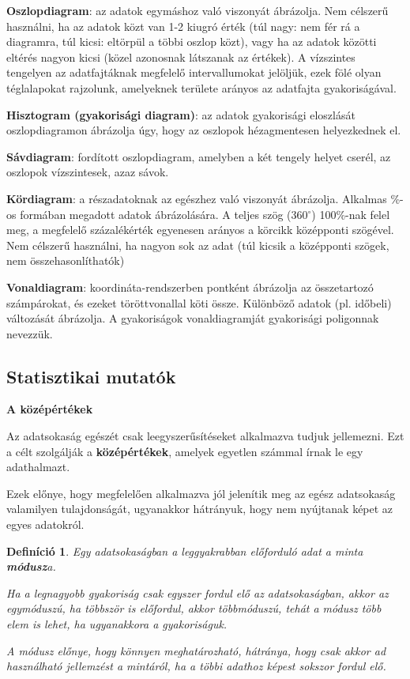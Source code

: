 \documentclass[12pt,a4paper]{article}
\newtheorem{definition}{Definíció} [section]
\begin{document}
\textbf{Oszlopdiagram}: az adatok egymáshoz való viszonyát ábrázolja. Nem célszerű használni, ha az adatok közt van 1-2 kiugró érték (túl nagy: nem fér rá a diagramra, túl kicsi: eltörpül a többi oszlop közt), vagy ha az adatok közötti eltérés nagyon kicsi (közel azonosnak látszanak az értékek). A vízszintes tengelyen az adatfajtáknak megfelelő intervallumokat jelöljük, ezek fölé olyan téglalapokat rajzolunk, amelyeknek területe arányos az adatfajta gyakoriságával.

\textbf{Hisztogram (gyakorisági diagram)}: az adatok gyakorisági eloszlását oszlopdiagramon ábrázolja úgy, hogy az oszlopok hézagmentesen helyezkednek el.

\textbf{Sávdiagram}: fordított oszlopdiagram, amelyben a két tengely helyet cserél, az oszlopok vízszintesek, azaz sávok.

\textbf{Kördiagram}: a részadatoknak az egészhez való viszonyát ábrázolja. Alkalmas \%-os formában megadott adatok ábrázolására. A teljes szög (360$^\circ$) 100\%-nak felel meg, a megfelelő százalékérték egyenesen arányos a körcikk középponti szögével. Nem célszerű használni, ha nagyon sok az adat (túl kicsik a középponti szögek, nem összehasonlíthatók)

\textbf{Vonaldiagram}: koordináta-rendszerben pontként ábrázolja az összetartozó számpárokat, és ezeket töröttvonallal köti össze. Különböző adatok (pl. időbeli) változását ábrázolja. A gyakoriságok vonaldiagramját gyakorisági poligonnak nevezzük.

\subsection{Statisztikai mutatók}
\textbf{A középértékek}

Az adatsokaság egészét csak leegyszerűsítéseket alkalmazva tudjuk jellemezni. Ezt a célt szolgálják a \textbf{középértékek}, amelyek egyetlen számmal írnak le egy adathalmazt.

Ezek előnye, hogy megfelelően alkalmazva jól jelenítik meg az egész adatsokaság valamilyen tulajdonságát, ugyanakkor hátrányuk, hogy nem nyújtanak képet az egyes adatokról.

\begin{definition}
Egy adatsokaságban a leggyakrabban előforduló adat a minta \textbf{módusz}a.

Ha a legnagyobb gyakoriság csak egyszer fordul elő az adatsokaságban, akkor az egymóduszú, ha többször is előfordul, akkor többmóduszú, tehát a módusz több elem is lehet, ha ugyanakkora a gyakoriságuk.

A módusz előnye, hogy könnyen meghatározható, hátránya, hogy csak akkor ad használható
jellemzést a mintáról, ha a többi adathoz képest sokszor fordul elő.
\end{definition}
\end{document}
